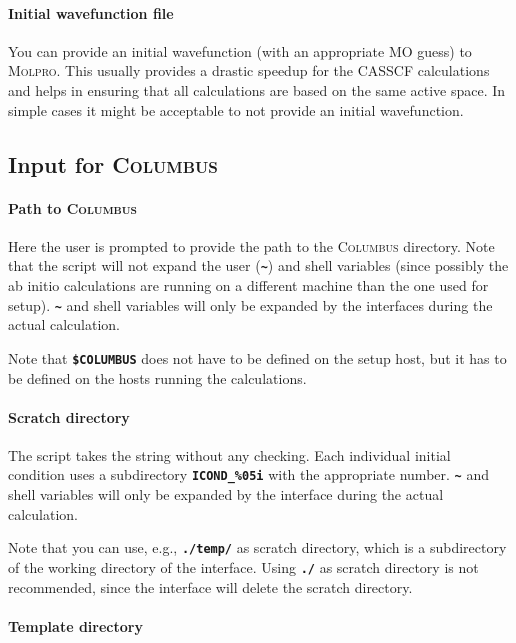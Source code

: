 \documentclass[a4paper,11pt,DIV=15,openany,twoside=false]{scrbook}
\newcommand{\ttt}[1]{\textbf{\texttt{#1}}}
\begin{document}
\paragraph{Initial wavefunction file}

You can provide an initial wavefunction (with an appropriate MO guess) to \textsc{Molpro}. This usually provides a drastic speedup for the CASSCF calculations and helps in ensuring that all calculations are based on the same active space. In simple cases it might be acceptable to not provide an initial wavefunction.

\subsection{Input for \textsc{Columbus}}

\paragraph{Path to \textsc{Columbus}}

Here the user is prompted to provide the path to the \textsc{Columbus} directory. Note that the script will not expand the user (\ttt{\textasciitilde}) and shell variables (since possibly the ab initio calculations are running on a different machine than the one used for setup). \ttt{\textasciitilde} and shell variables will only be expanded by the interfaces during the actual calculation.

Note that \ttt{\$COLUMBUS} does not have to be defined on the setup host, but it has to be defined on the hosts running the calculations.

\paragraph{Scratch directory}

The script takes the string without any checking. Each individual initial condition uses a subdirectory \ttt{ICOND\_\%05i} with the appropriate number. \ttt{\textasciitilde} and shell variables will only be expanded by the interface during the actual calculation.

Note that you can use, e.g., \ttt{./temp/} as scratch directory, which is a subdirectory of the working directory of the interface. Using \ttt{./} as scratch directory is not recommended, since the interface will delete the scratch directory.

\paragraph{Template directory}
\end{document}
